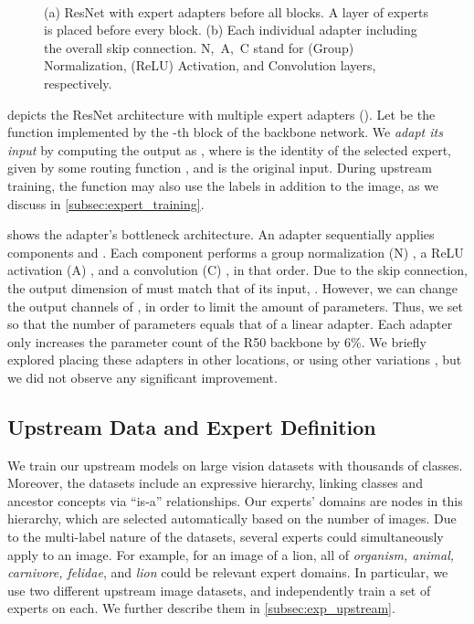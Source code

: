 \documentclass{article}
\begin{document}
\begin{figure}[tb]
\centering
{}
~~~~~~
\caption{
(a) ResNet  with expert adapters before all blocks. A layer of experts is placed before every block.
(b) Each individual adapter including the overall skip connection.
\mbox{N, A, C} stand for (Group) Normalization, (ReLU) Activation,
and Convolution layers, respectively.
\label{fig:architecture}}
\vspace{-2em}
\end{figure}

 depicts the ResNet architecture with multiple expert
adapters (). Let  be the function implemented by 
the -th block of the backbone network. We \emph{adapt its input} by computing the output as ,
where  is the identity of the selected expert, given by some routing function , 
and  is the original input. During upstream training, the function  may also 
use the labels in addition to the image, as we discuss in  \cref{subsec:expert_training}.




 shows the adapter's bottleneck architecture.
An adapter sequentially applies components  and .
Each component performs a group normalization (N) \cite{Wu_2018_ECCV}, 
a ReLU activation (A) \cite{glorot2011deep}, and a convolution (C) 
\cite{fukushima1980neocognitron,lecun1989backpropagation}, in that order.
Due to the skip connection, the output dimension of  must match that of its input, 
. However, we can change the output channels  of , in 
order to limit the amount of parameters. Thus, we set  so that the 
number of parameters equals that of a linear adapter. Each adapter only increases the parameter count of the R50 backbone by 6\%.
We briefly explored placing these adapters in other locations, or using other variations \cite{rebuffi2018efficient}, but we did not observe any significant improvement.

\subsection{Upstream Data and Expert Definition}

We train our upstream models on large vision datasets
with thousands of classes.
Moreover, the datasets include an expressive hierarchy, linking classes and ancestor concepts via ``is-a'' relationships.
Our experts' domains are nodes in this hierarchy, which are selected automatically based on the number of images.
Due to the multi-label nature of the datasets, several experts could
simultaneously apply to an image.
For example, for an image of a lion, all of
\textit{organism, animal, carnivore, felidae}, and \textit{lion} could be 
relevant expert domains.
In particular, we use two different upstream image datasets, 
and independently train a set of experts on each.
We further describe them in \cref{subsec:exp_upstream}.
\end{document}
